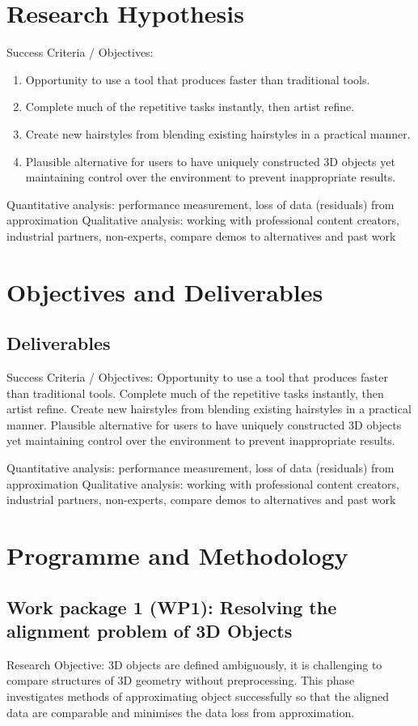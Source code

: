 \documentclass[a4paper, fontsize=15pt, onecolumn]{article} %
\numberwithin{equation}{section} %
\numberwithin{figure}{section} %
\numberwithin{table}{section} %
\begin{document}
\section{Research Hypothesis}
Success Criteria / Objectives: 
\begin{enumerate}
	\item Opportunity to use a tool that produces faster than traditional tools.
	\item Complete much of the repetitive tasks instantly, then artist refine.
	\item Create new hairstyles from blending existing hairstyles in a practical manner.
	\item Plausible alternative for users to have uniquely constructed 3D objects yet maintaining control over the environment to prevent inappropriate results.
\end{enumerate}

Quantitative analysis: performance measurement, loss of data (residuals) from approximation
Qualitative analysis: working with professional content creators, industrial partners, non-experts, compare demos to alternatives and past work

\section{Objectives and Deliverables}
\subsection{Deliverables}
Success Criteria / Objectives: 
Opportunity to use a tool that produces faster than traditional tools.
Complete much of the repetitive tasks instantly, then artist refine.
Create new hairstyles from blending existing hairstyles in a practical manner.
Plausible alternative for users to have uniquely constructed 3D objects yet maintaining control over the environment to prevent inappropriate results.

Quantitative analysis: performance measurement, loss of data (residuals) from approximation
Qualitative analysis: working with professional content creators, industrial partners, non-experts, compare demos to alternatives and past work

\section{Programme and Methodology}
\subsection{Work package 1 (WP1): Resolving the alignment problem of 3D Objects}	
Research Objective: 3D objects are defined ambiguously, it is challenging to compare structures of 3D geometry without preprocessing. This phase investigates methods of approximating object successfully so that the aligned data are comparable and minimises the data loss from approximation.
\end{document}
